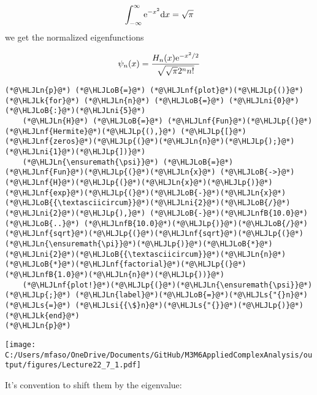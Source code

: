 \documentclass[12pt,landscape]{article}
\newcommand{\HLJLk}[1]{\textcolor[RGB]{148,91,176}{\textbf{#1}}}
\newcommand{\HLJLn}[1]{#1}
\newcommand{\HLJLnf}[1]{\textcolor[RGB]{66,102,213}{#1}}
\newcommand{\HLJLs}[1]{\textcolor[RGB]{201,61,57}{#1}}
\newcommand{\HLJLsi}[1]{#1}
\newcommand{\HLJLnfB}[1]{\textcolor[RGB]{59,151,46}{#1}}
\newcommand{\HLJLni}[1]{\textcolor[RGB]{59,151,46}{#1}}
\newcommand{\HLJLoB}[1]{\textcolor[RGB]{102,102,102}{\textbf{#1}}}
\newcommand{\HLJLp}[1]{#1}
\def\D{ {\rm d} }
\def\E{ {\rm e} }
\def\dx{\D x}
\begin{document}
{\[
    \int_{-\infty}^\infty \E^{-x^2} \dx = \sqrt{\pi}
\]
we get the normalized eigenfunctions

\[
    \psi_n(x) = {H_n(x)\E^{-x^2/2}  \over \sqrt{\sqrt{\pi} 2^n n!} }
\]

\begin{lstlisting}
(*@\HLJLn{p}@*) (*@\HLJLoB{=}@*) (*@\HLJLnf{plot}@*)(*@\HLJLp{()}@*)
(*@\HLJLk{for}@*) (*@\HLJLn{n}@*) (*@\HLJLoB{=}@*) (*@\HLJLni{0}@*)(*@\HLJLoB{:}@*)(*@\HLJLni{5}@*)
    (*@\HLJLn{H}@*) (*@\HLJLoB{=}@*) (*@\HLJLnf{Fun}@*)(*@\HLJLp{(}@*)(*@\HLJLnf{Hermite}@*)(*@\HLJLp{(),}@*) (*@\HLJLp{[}@*)(*@\HLJLnf{zeros}@*)(*@\HLJLp{(}@*)(*@\HLJLn{n}@*)(*@\HLJLp{);}@*)(*@\HLJLni{1}@*)(*@\HLJLp{])}@*)
    (*@\HLJLn{\ensuremath{\psi}}@*) (*@\HLJLoB{=}@*) (*@\HLJLnf{Fun}@*)(*@\HLJLp{(}@*)(*@\HLJLn{x}@*) (*@\HLJLoB{->}@*) (*@\HLJLnf{H}@*)(*@\HLJLp{(}@*)(*@\HLJLn{x}@*)(*@\HLJLp{)}@*)(*@\HLJLnf{exp}@*)(*@\HLJLp{(}@*)(*@\HLJLoB{-}@*)(*@\HLJLn{x}@*)(*@\HLJLoB{{\textasciicircum}}@*)(*@\HLJLni{2}@*)(*@\HLJLoB{/}@*)(*@\HLJLni{2}@*)(*@\HLJLp{),}@*) (*@\HLJLoB{-}@*)(*@\HLJLnfB{10.0}@*) (*@\HLJLoB{..}@*) (*@\HLJLnfB{10.0}@*)(*@\HLJLp{)}@*)(*@\HLJLoB{/}@*)(*@\HLJLnf{sqrt}@*)(*@\HLJLp{(}@*)(*@\HLJLnf{sqrt}@*)(*@\HLJLp{(}@*)(*@\HLJLn{\ensuremath{\pi}}@*)(*@\HLJLp{)}@*)(*@\HLJLoB{*}@*)(*@\HLJLni{2}@*)(*@\HLJLoB{{\textasciicircum}}@*)(*@\HLJLn{n}@*)(*@\HLJLoB{*}@*)(*@\HLJLnf{factorial}@*)(*@\HLJLp{(}@*)(*@\HLJLnfB{1.0}@*)(*@\HLJLn{n}@*)(*@\HLJLp{))}@*)
    (*@\HLJLnf{plot!}@*)(*@\HLJLp{(}@*)(*@\HLJLn{\ensuremath{\psi}}@*)(*@\HLJLp{;}@*) (*@\HLJLn{label}@*)(*@\HLJLoB{=}@*)(*@\HLJLs{"{}n}@*) (*@\HLJLs{=}@*) (*@\HLJLsi{{\$}n}@*)(*@\HLJLs{"{}}@*)(*@\HLJLp{)}@*)
(*@\HLJLk{end}@*)
(*@\HLJLn{p}@*)
\end{lstlisting}

\texttt{[image: C:/Users/mfaso/OneDrive/Documents/GitHub/M3M6AppliedComplexAnalysis/output/figures/Lecture22\_7\_1.pdf]}

It's convention to shift them by the eigenvalue:


}
\end{document}
